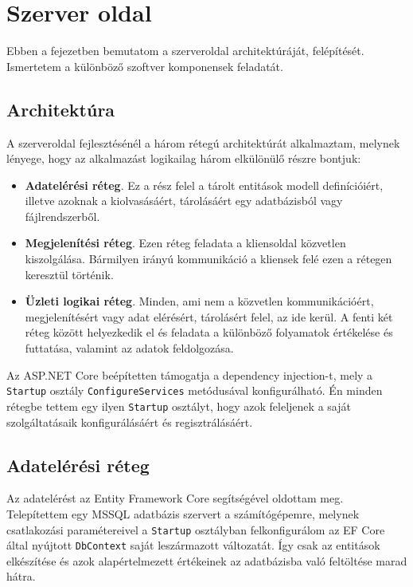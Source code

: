 \chapter{Szerver oldal}
\label{chapt:birdmap-backend}
Ebben a fejezetben bemutatom a szerveroldal architektúráját, felépítését. Ismertetem a különböző szoftver komponensek feladatát.

\section{Architektúra}
A szerveroldal fejlesztésénél a három rétegú architektúrát alkalmaztam, melynek lényege, hogy az alkalmazást logikailag három elkülönülő részre bontjuk:
\begin{itemize}
    \item \textbf{Adatelérési réteg}. Ez a rész felel a tárolt entitások modell definícióiért, illetve azoknak a kiolvasásáért, tárolásáért egy adatbázisból vagy fájlrendszerből.
    \item \textbf{Megjelenítési réteg}. Ezen réteg feladata a kliensoldal közvetlen kiszolgálása. Bármilyen irányú kommunikáció a kliensek felé ezen a rétegen keresztül történik.
    \item \textbf{Üzleti logikai réteg}. Minden, ami nem a közvetlen kommunikációért, megjelenítésért vagy adat elérésért, tárolásért felel, az ide kerül.
    A fenti két réteg között helyezkedik el és feladata a különböző folyamatok értékelése és futtatása, valamint az adatok feldolgozása.
\end{itemize}

Az ASP.NET Core beépítetten támogatja a dependency injection-t, mely a \verb+Startup+ osztály \verb+ConfigureServices+ metódusával konfigurálható.
Én minden rétegbe tettem egy ilyen \verb+Startup+ osztályt, hogy azok feleljenek a saját szolgáltatásaik konfigurálásáért és regisztrálásáért.

\section{Adatelérési réteg}
Az adatelérést az Entity Framework Core segítségével oldottam meg. Telepítettem egy MSSQL adatbázis szervert a számítógépemre, melynek csatlakozási paramétereivel
a \verb+Startup+ osztályban felkonfigurálom az EF Core által nyújtott \verb+DbContext+ saját leszármazott változatát. 
Így csak az entitások elkészítése és azok alapértelmezett értékeinek az adatbázisba való feltöltése marad hátra.

